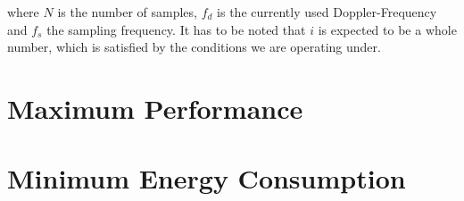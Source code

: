 		where $N$ is the number of samples, $f_d$ is the currently used Doppler-Frequency and $f_s$ the sampling frequency. It has to be noted that $i$ is expected to be a whole number, which is satisfied by the conditions we are operating under.

	\section{Maximum Performance} %
	\label{sec:impl_max_perf}
		

	\section{Minimum Energy Consumption} %
	\label{sec:impl_min_energy}
		
